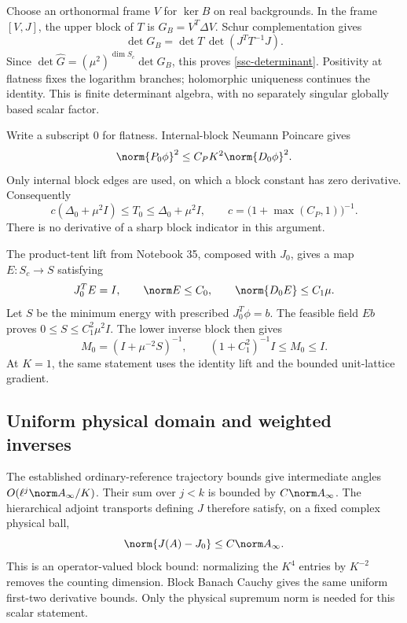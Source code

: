 Choose an orthonormal frame \(V\) for \(\ker B\) on real backgrounds.
In the frame \([V,J]\), the upper block of \(T\) is
\(G_B=V^T\Delta V\). Schur complementation gives
\[
 \det G_B=\det T\,\det(J^TT^{-1}J).
\]
Since \(\det\widehat G=(\mu^2)^{\dim S_c}\det G_B\), this proves
\eqref{ssc-determinant}. Positivity at flatness fixes the logarithm
branches; holomorphic uniqueness continues the identity. This is
finite determinant algebra, with no separately singular globally
based scalar factor.

Write a subscript \(0\) for flatness. Internal-block Neumann Poincare
gives
\[
 \norm{P_0\phi}^2\le C_P K^2\norm{D_0\phi}^2.
\]
Only internal block edges are used, on which a block constant has
zero derivative. Consequently
\begin{equation}
 c(\Delta_0+\mu^2I)\le T_0\le\Delta_0+\mu^2I,\qquad
 c=\bigl(1+\max(C_P,1)\bigr)^{-1}.
 \label{ssc-ellipticity}
\end{equation}
There is no derivative of a sharp block indicator in this argument.

The product-tent lift from Notebook 35, composed with \(J_0\), gives
a map \(E:S_c\to S\) satisfying
\[
 J_0^TE=I,\qquad \norm E\le C_0,\qquad
 \norm{D_0E}\le C_1\mu .
\]
Let \(S\) be the minimum energy with prescribed \(J_0^T\phi=b\).
The feasible field \(Eb\) proves \(0\le S\le C_1^2\mu^2I\).
The lower inverse block then gives
\begin{equation}
 M_0=(I+\mu^{-2}S)^{-1},\qquad
 (1+C_1^2)^{-1}I\le M_0\le I .
 \label{ssc-coarse-gap}
\end{equation}
At \(K=1\), the same statement uses the identity lift and the bounded
unit-lattice gradient.

\subsection{Uniform physical domain and weighted inverses}

The established ordinary-reference trajectory bounds give
intermediate angles \(O(\ell^j\norm A_\infty/K)\). Their sum over
\(j<k\) is bounded by \(C\norm A_\infty\). The hierarchical
adjoint transports defining \(J\) therefore satisfy, on a fixed
complex physical ball,
\begin{equation}
 \norm{J(A)-J_0}\le C\norm A_\infty .
 \label{ssc-J-bound}
\end{equation}
This is an operator-valued block bound: normalizing the \(K^4\)
entries by \(K^{-2}\) removes the counting dimension. Block Banach
Cauchy gives the same uniform first-two derivative bounds.
Only the physical supremum norm is needed for this scalar statement.

